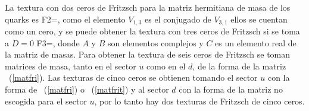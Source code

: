 La textura con dos ceros de Fritzsch para la matriz hermitiana de masa de los 
quarks es 
\be
\label{matfrit}
{F2}=\matFritti,
\ee
como el elemento $V_{1,3}$ es el conjugado de $V_{3,1}$ ellos se cuentan como un
cero, y se puede obtener la textura con tres ceros de Fritzsch si se toma a 
$D=0$
\be\label{matfri}
{F3}=\matFrit,
\ee
donde $A$ y $B$ son elementos complejos y $C$ es un elemento real de la matriz 
de masas. Para obtener la textura de seis ceros de Fritzsch se toman matrices de
masa, tanto en el sector $u$ como en el $d$, de la forma de la matriz 
~(\ref{matfri}). Las texturas de cinco ceros se obtienen tomando el sector $u$ 
con la forma de ~(\ref{matfri}) o ~(\ref{matfrit}) y al sector $d$ con la forma 
de la matriz no escogida para el sector $u$, por lo tanto hay dos texturas de 
Fritzsch de cinco ceros.  

